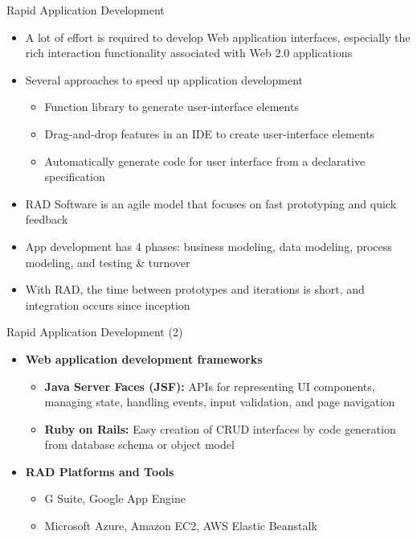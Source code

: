 \documentclass[aspectratio=169, xcolor=dvipsnames]{beamer}
\begin{document}
\begin{frame}{Rapid Application Development}
    \begin{itemize}[<+->]
        \item A lot of effort is required to develop Web application interfaces, especially the rich interaction functionality associated with Web 2.0 applications
        \item Several approaches to speed up application development
        \begin{itemize}
            \item[$\triangleright$] Function library to generate user-interface elements
            \item[$\triangleright$] Drag-and-drop features in an IDE to create user-interface elements
            \item[$\triangleright$] Automatically generate code for user interface from a declarative specification
        \end{itemize}
        \item RAD Software is an agile model that focuses on fast prototyping and quick feedback
        \item App development has 4 phases: business modeling, data modeling, process modeling, and testing \& turnover
        \item With RAD, the time between prototypes and iterations is short, and integration occurs since inception
    \end{itemize}
\end{frame}

\begin{frame}{Rapid Application Development (2)}
    \begin{itemize}[<+->]
        \item \textbf{Web application development frameworks}
        \begin{itemize}
            \item[$\triangleright$] \textbf{Java Server Faces (JSF):} APIs for representing UI components, managing state, handling events, input validation, and page navigation
            \item[$\triangleright$] \textbf{Ruby on Rails:} Easy creation of CRUD interfaces by code generation from database schema or object model
        \end{itemize}
        \item \textbf{RAD Platforms and Tools}
        \begin{itemize}
            \item[$\triangleright$] G Suite, Google App Engine
            \item[$\triangleright$] Microsoft Azure, Amazon EC2, AWS Elastic Beanstalk
        \end{itemize}
    \end{itemize}
\end{frame}
\end{document}

